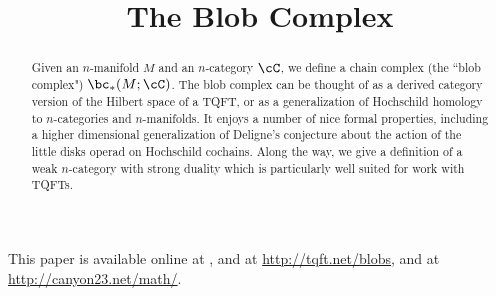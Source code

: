 \documentclass[11pt,leqno]{article}
\title{The Blob Complex}
\begin{document}
\makeatletter
{}
\gdef\theequation{\thesection.\arabic{equation}}
\makeatother

\maketitle

%

\begin{abstract}
Given an $n$-manifold $M$ and an $n$-category $\cC$, we define a chain complex
(the ``blob complex") $\bc_*(M; \cC)$.
The blob complex can be thought of as a derived category version of the Hilbert space of a TQFT, 
or as a generalization of Hochschild homology to $n$-categories and $n$-manifolds.
It enjoys a number of nice formal properties, including a higher dimensional
generalization of Deligne's conjecture about the action of the little disks operad on Hochschild cochains.
Along the way, we give a definition of a weak $n$-category with strong duality which
is particularly well suited for work with TQFTs.
\end{abstract}


\tableofcontents




















\appendix





%



%




This paper is available online at , and at
\url{http://tqft.net/blobs},
and at \url{http://canyon23.net/math/}.

\end{document}
